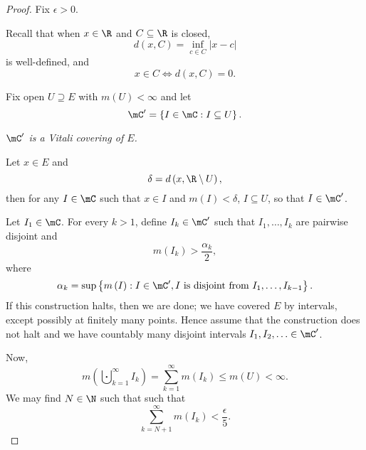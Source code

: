 \documentclass[pmath451]{subfiles}
\begin{document}
    \begin{proof}
        Fix $\epsilon>0$.

        Recall that when $x\in\R$ and $C\subseteq\R$ is closed,
        \begin{equation*}
            d\left( x,C \right) = \inf_{c\in C}\left| x-c \right|
        \end{equation*}
        is well-defined, and
        \begin{equation*}
            x\in C \iff d\left( x,C \right) = 0.
        \end{equation*}

        Fix open $U\supseteq E$ with $m\left( U \right)<\infty$ and let
        \begin{equation*}
            \mC' = \left\lbrace I\in\mC: I\subseteq U \right\rbrace.
        \end{equation*}

        \begin{claim}
            \textit{$\mC'$ is a Vitali covering of $E$.}

            Let $x\in E$ and
            \begin{equation*}
                \delta = d\left( x, \R\setminus U \right),
            \end{equation*}
            then for any $I\in\mC$ such that $x\in I$ and $m\left( I \right)<\delta$, $I\subseteq U$, so that $I\in\mC'$.
        \end{claim}

        Let $I_1\in\mC$. For every $k>1$, define $I_k\in\mC'$ such that $I_1,\ldots,I_k$ are pairwise disjoint and
        \begin{equation*}
            m\left( I_k \right) > \frac{\alpha_k}{2},
        \end{equation*}
        where
        \begin{equation*}
            \alpha_k = \sup\left\lbrace m\left( I \right): I\in\mC', I\text{ is disjoint from $I_1,\ldots,I_{k-1}$}\right\rbrace.
        \end{equation*}
        If this construction halts, then we are done; we have covered $E$ by intervals, except possibly at finitely many points. Hence assume that the construction does not halt and we have countably many disjoint intervals $I_1,I_2,\ldots\in\mC'$.

        Now,
        \begin{equation*}
            m\left( \bigcupdot^{\infty}_{k=1} I_k \right) = \sum^{\infty}_{k=1} m\left( I_k \right) \leq m\left( U \right) < \infty.
        \end{equation*}
        We may find $N\in\N$ such that such that
        \begin{equation*}
            \sum^{\infty}_{k=N+1} m\left( I_k \right) < \frac{\epsilon}{5}.
        \end{equation*}


\end{proof}
\end{document}
